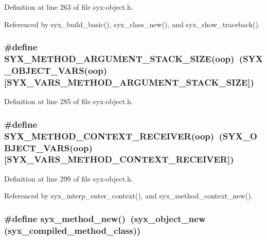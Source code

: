 Definition at line 263 of file syx-object.h.

Referenced by syx\_\-build\_\-basic(), syx\_\-class\_\-new(), and syx\_\-show\_\-traceback().\hypertarget{syx-object_8h_ac97fbf967b26d249d0ba6afe235e39c}{
\subsubsection{\setlength{\rightskip}{0pt plus 5cm}\#define SYX\_\-METHOD\_\-ARGUMENT\_\-STACK\_\-SIZE(oop)~(SYX\_\-OBJECT\_\-VARS(oop)\mbox{[}SYX\_\-VARS\_\-METHOD\_\-ARGUMENT\_\-STACK\_\-SIZE\mbox{]})}}
\label{syx-object_8h_ac97fbf967b26d249d0ba6afe235e39c}




Definition at line 285 of file syx-object.h.\hypertarget{syx-object_8h_55222831a7e6ae8717b66ecb10d077b5}{
\subsubsection{\setlength{\rightskip}{0pt plus 5cm}\#define SYX\_\-METHOD\_\-CONTEXT\_\-RECEIVER(oop)~(SYX\_\-OBJECT\_\-VARS(oop)\mbox{[}SYX\_\-VARS\_\-METHOD\_\-CONTEXT\_\-RECEIVER\mbox{]})}}
\label{syx-object_8h_55222831a7e6ae8717b66ecb10d077b5}




Definition at line 299 of file syx-object.h.

Referenced by syx\_\-interp\_\-enter\_\-context(), and syx\_\-method\_\-context\_\-new().\hypertarget{syx-object_8h_affde2fe16c24eeb141ee81ed91fe267}{
\subsubsection{\setlength{\rightskip}{0pt plus 5cm}\#define syx\_\-method\_\-new()~(syx\_\-object\_\-new ({\bf syx\_\-compiled\_\-method\_\-class}))}}
\label{syx-object_8h_affde2fe16c24eeb141ee81ed91fe267}


